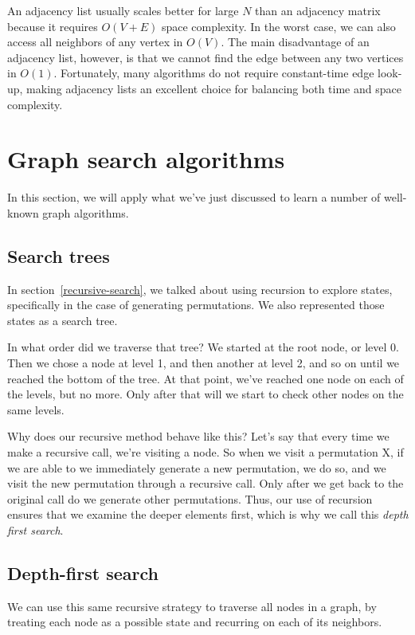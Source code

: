 An adjacency list usually scales better for large $N$ than an adjacency matrix because it requires $O(V+E)$ space complexity. In the worst case, we can also access all neighbors of any vertex in $O(V)$. The main disadvantage of an adjacency list, however, is that we cannot find the edge between any two vertices in $O(1)$. Fortunately, many algorithms do not require constant-time edge look-up, making adjacency lists an excellent choice for balancing both time and space complexity. 


\section{Graph search algorithms} \label{sec:graph-search}

In this section, we will apply what we've just discussed to learn a number of well-known graph algorithms. 


\subsection{Search trees}

In section~\ref{recursive-search}, we talked about using recursion to explore states, specifically in the case of generating permutations. We also represented those states as a search tree.

In what order did we traverse that tree? We started at the root node, or level 0. Then we chose a node at level 1, and then another at level 2, and so on until we reached the bottom of the tree. At that point, we've reached one node on each of the levels, but no more. Only after that will we start to check other nodes on the same levels.

Why does our recursive method behave like this? Let's say that every time we make a recursive call, we're visiting a node. So when we visit a permutation X, if we are able to we immediately generate a new permutation, we do so, and we visit the new permutation through a recursive call. Only after we get back to the original call do we generate other permutations. Thus, our use of recursion ensures that we examine the deeper elements first, which is why we call this \textit{depth first search}.


\subsection{Depth-first search}

We can use this same recursive strategy to traverse all nodes in a graph, by treating each node as a possible state and recurring on each of its neighbors.

